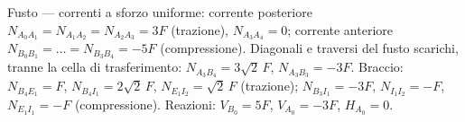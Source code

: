 \begin{esercizio}
\begin{svolgimento}



		
	\end{svolgimento}
	
	\risultato
	Fusto --- correnti a sforzo uniforme: corrente
	posteriore $N_{A_0A_1}=N_{A_1A_2}=N_{A_2A_3}=3F$
	(trazione), $N_{A_3A_4}=0$; corrente anteriore
	$N_{B_0B_1}=\dots=N_{B_3B_4}=-5F$ (compressione).
	Diagonali e traversi del fusto scarichi, tranne la cella
	di trasferimento: $N_{A_3B_4}=3\sqrt2\,F$,
	$N_{A_3B_3}=-3F$. Braccio: $N_{B_4E_1}=F$,
	$N_{B_4I_1}=2\sqrt2\,F$, $N_{E_1I_2}=\sqrt2\,F$
	(trazione); $N_{B_3I_1}=-3F$, $N_{I_1I_2}=-F$,
	$N_{E_1I_1}=-F$ (compressione). Reazioni:
	$V_{B_0}=5F$, $V_{A_0}=-3F$, $H_{A_0}=0$.
	
\end{esercizio}

